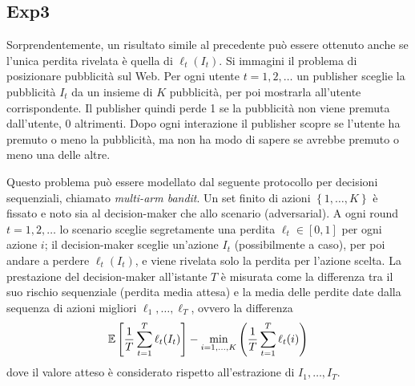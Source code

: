 \subsection{Exp3}

Sorprendentemente, un risultato simile al precedente può essere ottenuto anche se l'unica perdita rivelata è quella di $\ell_t(I_t)$. Si immagini il problema di posizionare pubblicità sul Web. Per ogni utente $t = 1, 2, \dots$ un publisher sceglie la pubblicità $I_t$ da un insieme di $K$ pubblicità, per poi mostrarla all'utente corrispondente. Il publisher quindi perde 1 se la pubblicità non viene premuta dall'utente, 0 altrimenti. Dopo ogni interazione il publisher scopre se l'utente ha premuto o meno la pubblicità, ma non ha modo di sapere se avrebbe premuto o meno una delle altre.

Questo problema può essere modellato dal seguente protocollo per decisioni sequenziali, chiamato \textit{multi-arm bandit}. Un set finito di azioni $\left\{1, \dots, K\right\}$ è fissato e noto sia al decision-maker che allo scenario (adversarial). A ogni round $t = 1,2, \dots$ lo scenario sceglie segretamente una perdita $\ell_t \in [0,1]$ per ogni azione $i$; il decision-maker sceglie un'azione $I_t$ (possibilmente a caso), per poi andare a perdere $\ell_t (I_t)$, e viene rivelata solo la perdita per l'azione scelta. La prestazione del decision-maker all'istante $T$ è misurata come la differenza tra il suo rischio sequenziale (perdita media attesa) e la media delle perdite date dalla sequenza di azioni migliori $\ell_1, \dots, \ell_T$, ovvero la differenza
$$ \mathbb{E} \left[\frac{1}{T} \sum_{t = 1}^T \ell_t (I_t)\right] - \min_{i = 1, \dots, K} \left(\frac{1}{T} \sum_{t = 1}^T \ell_t (i) \right) $$
dove il valore atteso è considerato rispetto all'estrazione di $I_1, \dots, I_T$.

